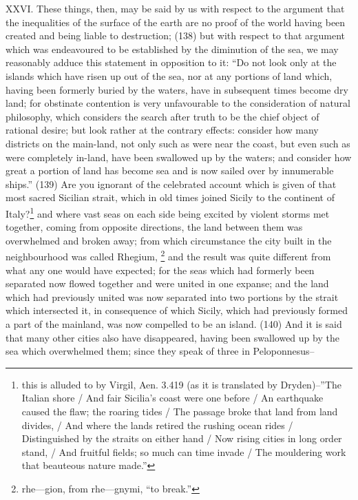 XXVI. These things, then, may be said by us with respect to the argument that the inequalities of
the surface of the earth are no proof of the world having been created and being liable to
destruction; (138) but with respect to that argument which was endeavoured to be established by
the diminution of the sea, we may reasonably adduce this statement in opposition to it: ``Do not look
only at the islands which have risen up out of the sea, nor at any portions of land which, having
been formerly buried by the waters, have in subsequent times become dry land; for obstinate
contention is very unfavourable to the consideration of natural philosophy, which considers the
search after truth to be the chief object of rational desire; but look rather at the contrary effects:
consider how many districts on the main-land, not only such as were near the coast, but even such
as were completely in-land, have been swallowed up by the waters; and consider how great a
portion of land has become sea and is now sailed over by innumerable ships.'' (139) Are you
ignorant of the celebrated account which is given of that most sacred Sicilian strait, which in old
times joined Sicily to the continent of Italy?\footnote{this is alluded to by Virgil, Aen. 3.419 (as it is translated by
Dryden)--''The Italian shore / And fair Sicilia's coast were one before / An earthquake caused the flaw; the roaring tides /
The passage broke that land from land divides, / And where the lands retired the rushing ocean rides / Distinguished by
the straits on either hand / Now rising cities in long order stand, / And fruitful fields; so much can time invade / The
mouldering work that beauteous nature made.''} and where vast seas on each side being excited by violent
storms met together, coming from opposite directions, the land between them was overwhelmed
and broken away; from which circumstance the city built in the neighbourhood was called
Rhegium, \footnote{rhe—gion, from rhe—gnymi, ``to break.''} and the result was quite different from what any one
would have expected; for the seas which had formerly been separated now flowed together and
were united in one expanse; and the land which had previously united was now separated into two
portions by the strait which intersected it, in consequence of which Sicily, which had previously
formed a part of the mainland, was now compelled to be an island. (140) And it is said that many
other cities also have disappeared, having been swallowed up by the sea which overwhelmed
them; since they speak of three in Peloponnesus--

